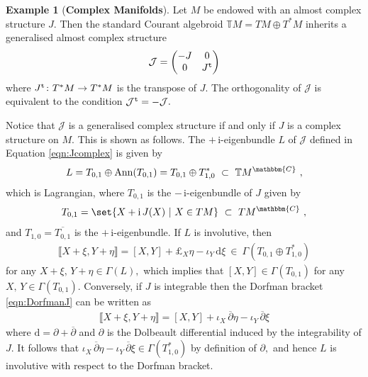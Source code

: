 \documentclass[a4paper, reqno, 11pt]{amsart}
\numberwithin{equation}{section}
\theoremstyle{definition}
\newtheorem{example}[equation]{Example}
\newcommand{\de}{\mathrm{d}}
\newcommand{\del}{\partial}
\newcommand{\ii}{\mathrm{i}}
\newcommand{\IC}{\mathbbm{C}}
\newcommand{\IT}{\mathbb{T}}
\newcommand{\cJ}{{\mathcal J}}
\theoremstyle{remark}
\begin{document}
\begin{example}[\textbf{Complex Manifolds}] \label{ex:complexmanifolds}
Let $M$ be endowed with an almost complex structure $J.$ Then the standard Courant algebroid $\IT M = TM \oplus T^*M$ inherits a generalised almost complex structure 
\begin{equation} \label{eqn:Jcomplex}
 \cJ =
 \begin{pmatrix}
 -J & 0 \\
 0 & J^{\tt t}
 \end{pmatrix}
\end{equation}
where $J^{\tt t} \colon T^*M \to T^*M$ is the transpose of $J.$ The orthogonality of $\cJ$ is equivalent to the condition
$\cJ^{\tt t} = - \cJ .$ 

Notice that $\cJ$ is a generalised complex structure if and only if $J$ is a complex structure on $M.$ This is shown as follows. The $+\,\ii$-eigenbundle $L$ of $\cJ$ defined in Equation \eqref{eqn:Jcomplex} is given by
\begin{align}
 L = T_{0,1} \oplus \mathrm{Ann}(T_{0,1}) = T_{0,1} \oplus T^*_{1,0} \ \subset \ \IT M^{\IC} \ ,   
\end{align}
which is Lagrangian, where $T_{0,1}$ is the $-\,\ii$-eigenbundle of $J$ given by
\begin{align}
    T_{0,1} = \set{X + \ii\, J(X) \ \vert \ X \in TM} \ \subset \ TM^{\IC} \ ,
\end{align}
and $T_{1,0}=\overline{T_{0,1}}$ is the $+\,\ii$-eigenbundle.
If $L$ is involutive, then
\begin{align}\label{eqn:DorfmanJ}
 \llbracket X+ \xi , Y + \eta \rrbracket = [X,Y] + \pounds_X \eta - \iota_Y\, \de \xi \ \in \ \mathsf{\Gamma}(T_{0,1} \oplus T^*_{1,0})   
\end{align}
for any $X + \xi , \, Y + \eta \in \mathsf{\Gamma}(L),$ which implies that $[X,Y] \in \mathsf{\Gamma}(T_{0,1})$ for any $X, \, Y \in \mathsf{\Gamma}(T_{0,1}).$ Conversely, if $J$ is integrable then the Dorfman bracket \eqref{eqn:DorfmanJ} can be written as
\begin{align}
 \llbracket X+ \xi , Y + \eta \rrbracket = [X,Y] + \iota_X \, \overline{\del} \eta -\iota_Y \, \overline{\del} \xi     
\end{align}
where $\de=\partial + \overline{\partial}$ and $\del$ is the Dolbeault differential induced by the integrability of $J.$ It follows that $\iota_X \, \overline{\del} \eta -\iota_Y \, \overline{\del} \xi \in \mathsf{\Gamma}(T^*_{1,0})$ by definition of $\del,$ 
 and hence $L$ is involutive with respect to the Dorfman bracket. 
\end{example}
\end{document}
